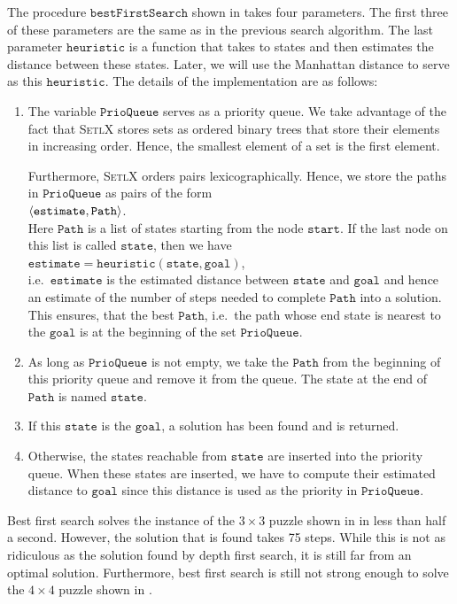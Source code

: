 The procedure $\mathtt{bestFirstSearch}$ shown in  takes four parameters.  The
first three of these parameters are the same as in the previous search algorithm.  The last parameter
$\mathtt{heuristic}$ is a function that takes to states and then estimates the distance between these states.
Later, we will use the Manhattan distance to serve as this $\mathtt{heuristic}$.  The details of the
implementation are as follows:
\begin{enumerate}
\item The variable $\mathtt{PrioQueue}$ serves as a priority queue.  We take advantage of the fact that
      \textsc{SetlX} stores sets as ordered binary trees that store their elements in increasing order.
      Hence, the smallest element of a set is the first element.

      Furthermore, \textsc{SetlX} orders pairs lexicographically.  Hence, we store the paths in
      $\mathtt{PrioQueue}$ as pairs of the form 
      \\[0.2cm]
      \hspace*{1.3cm}
      $\pair(\mathtt{estimate}, \mathtt{Path})$.
      \\[0.2cm]
      Here $\mathtt{Path}$ is a list of states starting from the node $\mathtt{start}$.  If the last node on
      this list is called $\mathtt{state}$, then we have
      \\[0.2cm]
      \hspace*{1.3cm}
      $\mathtt{estimate} = \mathtt{heuristic}(\mathtt{state}, \mathtt{goal})$,
      \\[0.2cm]
      i.e.~$\mathtt{estimate}$ is the estimated distance between $\mathtt{state}$ and $\mathtt{goal}$ and hence
      an estimate of the number of steps needed to complete $\mathtt{Path}$ into a solution.  This ensures,
      that the best $\mathtt{Path}$, i.e.~the path whose end state is nearest to the $\mathtt{goal}$ is at the
      beginning of the set $\mathtt{PrioQueue}$.
\item As long as $\mathtt{PrioQueue}$ is not empty, we take the $\mathtt{Path}$ from the beginning of this
      priority queue and remove it from the queue.  The state at the end of $\mathtt{Path}$ is named $\mathtt{state}$.
\item If this $\mathtt{state}$ is the $\mathtt{goal}$, a solution has been found and is returned.
\item Otherwise, the states reachable from $\mathtt{state}$ are inserted into the priority queue.
      When these states are inserted, we have to compute their estimated distance to $\mathtt{goal}$ since this
      distance is used as the priority in $\mathtt{PrioQueue}$.
\end{enumerate}
Best first search solves the instance of the $3 \times 3$ puzzle shown in  in less than
half a second.  However, the solution that is found takes 75 steps.  While this is not as ridiculous as the
solution found by depth first search, it is still far from an optimal solution.  Furthermore,
best first search is still not strong enough to solve the $4 \times 4$ puzzle shown in
. 

